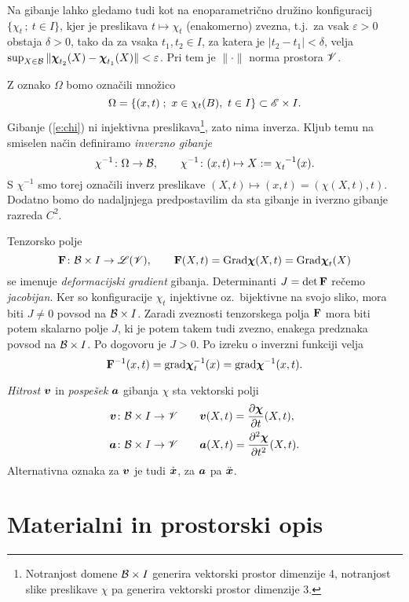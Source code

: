 Na gibanje lahko gledamo tudi kot na enoparametrično družino konfiguracij
$\{ \chi_t\,;\ t\in I \}$, kjer je preslikava $t\mapsto\chi_t$ (enakomerno) zvezna,
t.j.~za vsak $\varepsilon>0$ obstaja $\delta>0$, tako da za vsaka $t_1,t_2\in I$,
za katera je $|t_2-t_1|<\delta$, velja $\sup_{X\in\mathcal B}\|\boldsymbol \chi_{t_2}(X)-\boldsymbol \chi_{t_1}(X)\|<\varepsilon$.
Pri tem je $\|\cdot\|$ norma prostora $\mathscr V$.

Z oznako $\Omega$ bomo označili množico
\[ \Omega=\{(x,t)\;;\ x\in\chi_t(B),\ t\in I\}\subset\E\times I. \]
Gibanje (\ref{e:chi}) ni injektivna preslikava\footnote{Notranjost domene $\mathcal B\times I$ generira
vektorski prostor dimenzije 4, notranjost slike preslikave $\chi$ pa generira vektorski prostor dimenzije 3.},
zato nima inverza. Kljub temu na smiselen način definiramo \emph{inverzno gibanje}
\[
	\chi^{-1}\colon\Omega\to \B,\qquad
	\chi^{-1}\colon(x,t)\mapsto X:=\bottop{\chi}{t}{-1}(x).
\]
S $\chi^{-1}$ smo torej označili inverz preslikave $(X,t)\mapsto(x,t)=(\chi(X,t),t)$.
Dodatno bomo do nadaljnjega predpostavilim da sta gibanje in iverzno gibanje razreda $C^2$.

Tenzorsko polje
\[
	\mathbf F\colon \mathcal B\times I\to\mathscr L(\mathscr V),\qquad \mathbf F(X,t)=\mathrm{Grad}\boldsymbol \chi(X,t)=\mathrm{Grad}\boldsymbol \chi_t(X)
\]
se imenuje \emph{deformacijski gradient} gibanja. Determinanti $J=\det\mathbf F$ 
rečemo \emph{jacobijan}. Ker so konfiguracije $\chi_t$
injektivne oz.~bijektivne na svojo sliko, mora biti $J\neq 0$ povsod na $\mathcal B\times I$.
Zaradi zveznosti tenzorskega polja $\mathbf F$ mora biti potem skalarno polje $J$,
ki je potem takem tudi zvezno, enakega predznaka povsod na $\mathcal B\times I$. Po dogovoru je
$J>0$. Po izreku o inverzni funkciji velja
\[
	\mathbf F^{-1}(x,t)=\mathrm{grad}\boldsymbol \chi_t^{-1}(x)=\mathrm{grad}\boldsymbol \chi^{-1}(x,t).
\]

\emph{Hitrost} $\boldsymbol v$ in \emph{pospešek} $\boldsymbol a$ gibanja $\chi$ sta vektorski polji
\begin{align}
	\boldsymbol v\colon \mathcal B\times I\to \mathscr V \qquad & \boldsymbol v(X,t) = \frac{\partial\boldsymbol \chi}{\partial t}(X,t), \label{e:v} \\
	\boldsymbol a\colon \mathcal B\times I\to \mathscr V \qquad & \boldsymbol a(X,t) = \frac{\partial^2\boldsymbol \chi}{\partial t^2}(X,t). \label{e:a}
\end{align}
Alternativna oznaka za $\boldsymbol v$ je tudi $\dot{\boldsymbol x}$, za $\boldsymbol a$ pa $\ddot{\boldsymbol x}$.


\section{Materialni in prostorski opis}


